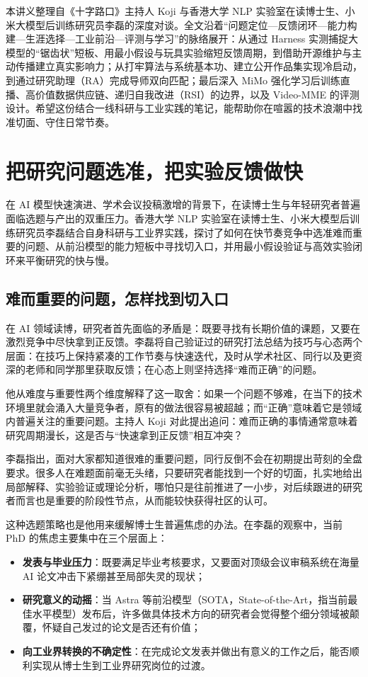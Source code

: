 \documentclass[UTF8,a4paper,11pt,fontset=fandol]{ctexart}
\begin{document}
本讲义整理自《十字路口》主持人 Koji 与香港大学 NLP 实验室在读博士生、小米大模型后训练研究员李磊的深度对谈。全文沿着“问题定位—反馈闭环—能力构建—生涯选择—工业前沿—评测与学习”的脉络展开：从通过 Harness 实测捕捉大模型的“锯齿状”短板、用最小假设与玩具实验缩短反馈周期，到借助开源维护与主动传播建立真实影响力；从打牢算法与系统基本功、建立公开作品集实现冷启动，到通过研究助理（RA）完成导师双向匹配；最后深入 MiMo 强化学习后训练直播、高价值数据供应链、递归自我改进（RSI）的边界，以及 Video-MME 的评测设计。希望这份结合一线科研与工业实践的笔记，能帮助你在喧嚣的技术浪潮中找准切面、守住日常节奏。
\section{把研究问题选准，把实验反馈做快}
在 AI 模型快速演进、学术会议投稿激增的背景下，在读博士生与年轻研究者普遍面临选题与产出的双重压力。香港大学 NLP 实验室在读博士生、小米大模型后训练研究员李磊结合自身科研与工业界实践，探讨了如何在快节奏竞争中选准难而重要的问题、从前沿模型的能力短板中寻找切入口，并用最小假设验证与高效实验闭环来平衡研究的快与慢。
\subsection{难而重要的问题，怎样找到切入口}
在 AI 领域读博，研究者首先面临的矛盾是：既要寻找有长期价值的课题，又要在激烈竞争中尽快拿到正反馈。李磊将自己验证过的研究打法总结为技巧与心态两个层面：在技巧上保持紧凑的工作节奏与快速迭代，及时从学术社区、同行以及更资深的老师和同学那里获取反馈；在心态上则坚持选择“难而正确”的问题。

他从难度与重要性两个维度解释了这一取舍：如果一个问题不够难，在当下的技术环境里就会涌入大量竞争者，原有的做法很容易被超越；而“正确”意味着它是领域内普遍关注的重要问题。主持人 Koji 对此提出追问：难而正确的事情通常意味着研究周期漫长，这是否与“快速拿到正反馈”相互冲突？

李磊指出，面对大家都知道很难的重要问题，同行反倒不会在初期提出苛刻的全盘要求。很多人在难题面前毫无头绪，只要研究者能找到一个好的切面，扎实地给出局部解释、实验验证或理论分析，哪怕只是往前推进了一小步，对后续跟进的研究者而言也是重要的阶段性节点，从而能较快获得社区的认可。

这种选题策略也是他用来缓解博士生普遍焦虑的办法。在李磊的观察中，当前 PhD 的焦虑主要集中在三个层面上：
\begin{itemize}
\item \textbf{发表与毕业压力}：既要满足毕业考核要求，又要面对顶级会议审稿系统在海量 AI 论文冲击下紧绷甚至局部失灵的现状；
\item \textbf{研究意义的动摇}：当 Astra 等前沿模型（SOTA，State-of-the-Art，指当前最佳水平模型）发布后，许多做具体技术方向的研究者会觉得整个细分领域被颠覆，怀疑自己发过的论文是否还有价值；
\item \textbf{向工业界转换的不确定性}：在完成论文发表并做出有意义的工作之后，能否顺利实现从博士生到工业界研究岗位的过渡。
\end{itemize}
\end{document}
